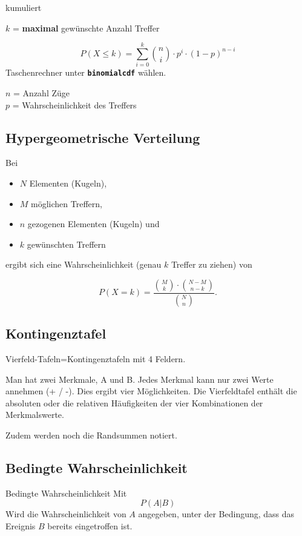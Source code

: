 \begin{multicols}{2}
\begin{gesetz}{kumuliert}{}

$k$ = \textbf{maximal} gewünschte Anzahl Treffer


$$P(X\le k) = \sum_{i=0}^{k}{n \choose i}\cdot{}p^i\cdot{}(1-p)^{n-i}$$
Taschenrechner
unter  \textbf{\texttt{binomialcdf}} wählen.

$n$ = Anzahl Züge\\
$p$ = Wahrscheinlichkeit des Treffers\\
\end{gesetz}

\subsection{Hypergeometrische Verteilung}
Bei
\begin{itemize}
\item $N$ Elementen (Kugeln),
\item $M$ möglichen Treffern,
\item $n$ gezogenen Elementen (Kugeln) und 
\item $k$ gewünschten Treffern
\end{itemize}
ergibt sich eine Wahrscheinlichkeit (genau $k$ Treffer zu ziehen) von

$$P(X=k) = \frac{ {M \choose k} \cdot {{N-M}  \choose {n-k}} }{{N \choose n}}.$$


\newpage
\subsection{Kontingenztafel}
Vierfeld-Tafeln=Kontingenztafeln mit 4 Feldern.

Man hat zwei Merkmale, A und B. Jedes Merkmal kann nur zwei Werte
annehmen (+ / -). Dies ergibt vier Möglichkeiten. Die Vierfeldtafel
enthält die absoluten oder die relativen Häufigkeiten der vier
Kombinationen der Merkmalswerte.

Zudem werden noch die Randsummen notiert.


\subsection{Bedingte Wahrscheinlichkeit}

\begin{definition}{Bedingte Wahrscheinlichkeit}{}
Mit
$$P(A|B)$$
Wird die Wahrscheinlichkeit von $A$ angegeben, unter der Bedingung,
dass das Ereignis $B$ bereits eingetroffen ist.
\end{definition}


\end{multicols}
